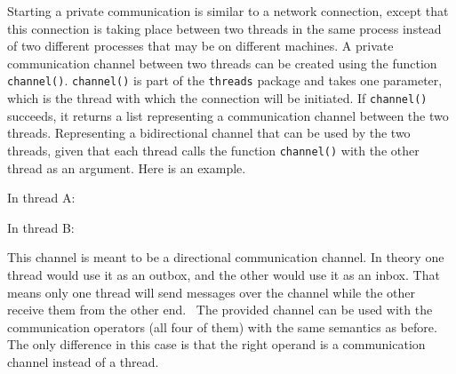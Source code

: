 Starting a private communication is similar to a network connection,
except that this connection is taking place between two threads in the
same process instead of two different processes that may be on
different machines. A private communication channel between two threads
can be created using the function \texttt{channel()}.
\texttt{channel()} is part of the
\texttt{threads} package and takes one parameter, which
is the thread with which the connection will be initiated. If
\texttt{channel()} succeeds, it returns a list representing
a communication channel between the two threads. Representing a
bidirectional channel that can be used by the two threads, given that
each thread calls the function \texttt{channel()} with the
other thread as an argument. Here is an example.

In thread A:


In thread B:


This channel is meant to be a directional communication channel. In
theory one thread would use it as an outbox, and the other would use it
as an inbox. That means only one thread will send messages over the
channel while the other receive them from the other end. \ The provided
channel can be used with the communication operators (all four of them)
with the same semantics as before. The only difference in this case is
that the right operand is a communication channel instead of a thread.



